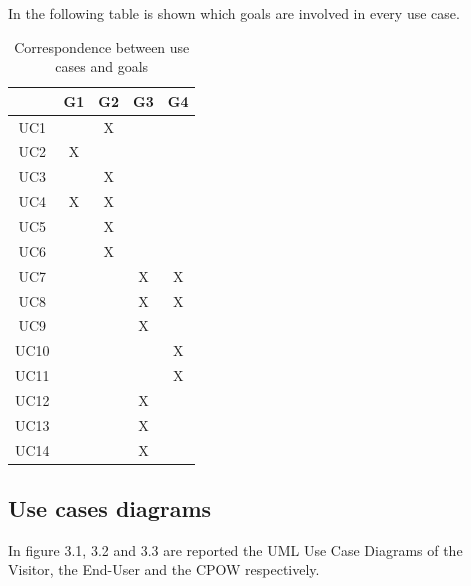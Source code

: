 \documentclass[a4paper]{report}
\begin{document}
In the following table is shown which goals are involved in every use case.
\begin{table}[H]
  \centering
  \begin{tabular}{|c|c|c|c|c|}
    \cline{2-5}
    \multicolumn{1}{c|}{} & G1 & G2 & G3 & G4 \\ \hline
    UC1 &   & X &   &   \\ \hline
    UC2 & X &   &   &   \\ \hline
    UC3 &   & X &   &   \\ \hline
    UC4 & X & X &   &   \\ \hline
    UC5 &   & X &   &   \\ \hline
    UC6 &   & X &   &   \\ \hline
    UC7 &   &   & X & X \\ \hline
    UC8 &   &   & X & X \\ \hline
    UC9 &   &   & X &   \\ \hline
    UC10 &   &   &   & X \\ \hline
    UC11 &   &   &   & X \\ \hline
    UC12 &   &   & X &   \\ \hline
    UC13 &   &   & X &   \\ \hline
    UC14 &   &   & X &   \\ \hline
  \end{tabular}
  \caption{Correspondence between use cases and goals}
\end{table}
\subsection{Use cases diagrams }
In figure 3.1, 3.2 and 3.3 are reported the UML Use Case Diagrams of the Visitor, the End-User and the CPOW respectively.
\end{document}
